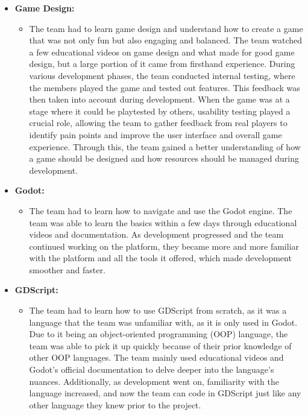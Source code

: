 \documentclass{article}
\begin{document}
\begin{itemize}
	\item \textbf{Game Design: } 
	\begin{itemize}
		\item The team had to learn game design and understand how to create a game that was not only fun but also engaging and balanced. The team watched a few educational videos on game design and what made for good game design, but a large portion of it came from firsthand experience. During various development phases, the team conducted internal testing, where the members played the game and tested out features. This feedback was then taken into account during development. When the game was at a stage where it could be playtested by others, usability testing played a crucial role, allowing the team to gather feedback from real players to identify pain points and improve the user interface and overall game experience. Through this, the team gained a better understanding of how a game should be designed and how resources should be managed during development.
	\end{itemize}
    \item \textbf{Godot:} 
    \begin{itemize}
        \item The team had to learn how to navigate and use the Godot engine. The team was able to learn the basics within a few days through educational videos and documentation. As development progressed and the team continued working on the platform, they became more and more familiar with the platform and all the tools it offered, which made development smoother and faster.   
    \end{itemize}
    \item \textbf{GDScript:} 
    \begin{itemize}
        \item  The team had to learn how to use GDScript from scratch, as it was a language that the team was unfamiliar with, as it is only used in Godot. Due to it being an object-oriented programming (OOP) language, the team was able to pick it up quickly because of their prior knowledge of other OOP languages. The team mainly used educational videos and Godot's official documentation to delve deeper into the language's nuances. Additionally, as development went on, familiarity with the language increased, and now the team can code in GDScript just like any other language they knew prior to the project.
    \end{itemize}
\end{itemize}
\end{document}

